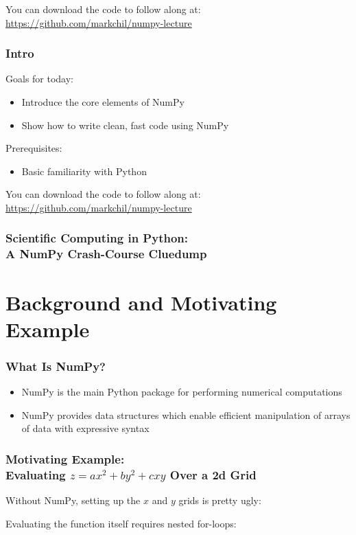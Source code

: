 \documentclass[xcolor={x11names,table}]{beamer}
\title{\stabletitle}
\author[markchil] 
{Mark Chilenski\\(markchil)}
\date{January 25, 2022}
\newcommand{\stabletitle}{Scientific Computing in Python:\\A NumPy Crash-Course Cluedump}
\begin{document}
\begin{frame}
 	\titlepage
	
	\begin{center}
		\item You can download the code to follow along at: \url{https://github.com/markchil/numpy-lecture}
	\end{center}
\end{frame}

\begin{frame}
	\frametitle{Intro}
	Goals for today:
	\begin{itemize}
		\item Introduce the core elements of NumPy
		\item Show how to write clean, fast code using NumPy
	\end{itemize}
	Prerequisites:
	\begin{itemize}
		\item Basic familiarity with Python
	\end{itemize}
	You can download the code to follow along at: \url{https://github.com/markchil/numpy-lecture}
\end{frame}

\begin{frame}
	\frametitle{\stabletitle}
	\tableofcontents
\end{frame}

\section{Background and Motivating Example}

\begin{frame}
	\frametitle{What Is NumPy?}
	\begin{itemize}
		\item NumPy is the main Python package for performing numerical computations
		\item NumPy provides data structures which enable efficient manipulation of arrays of data with expressive syntax
	\end{itemize}
\end{frame}

\begin{frame}
	\frametitle{Motivating Example:\\Evaluating $z=ax^{2}+by^{2}+cxy$ Over a 2d Grid}
	Without NumPy, setting up the $x$ and $y$ grids is pretty ugly:
	
	
	Evaluating the function itself requires nested for-loops:
	
\end{frame}
\end{document}

